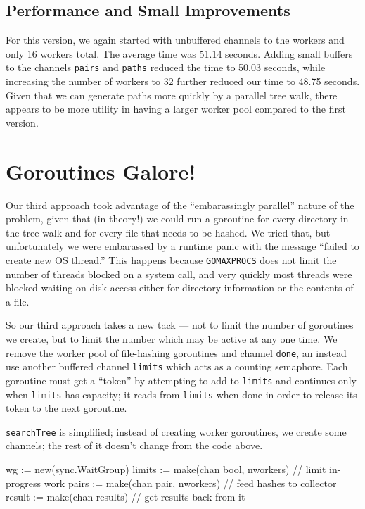 \documentclass[12pt,notitlepage]{article}
\begin{document}
\subsection{Performance and Small Improvements}
For this version, we again started with unbuffered channels to the workers and
only 16 workers total. The average time was 51.14 seconds. Adding small buffers
to the channels \verb|pairs| and \verb|paths| reduced the time to 50.03 seconds,
while increasing the number of workers to 32 further reduced our time to 48.75
seconds. Given that we can generate paths more quickly by a parallel tree walk,
there appears to be more utility in having a larger worker pool compared to the
first version.

\section{Goroutines Galore!}
Our third approach took advantage of the ``embarassingly parallel'' nature of
the problem, given that (in theory!) we could run a goroutine for every directory in
the tree walk and for every file that needs to be hashed. We tried that, but
unfortunately we were embarassed by a runtime panic with the message ``failed to
create new OS thread.'' This happens because \verb|GOMAXPROCS| does not limit the
number of threads blocked on a system call, and very quickly most threads were 
blocked waiting on disk access either for directory information or the contents 
of a file.

So our third approach takes a new tack --- not to limit the number of goroutines
we create, but to limit the number which may be active at any one time. We remove
the worker pool of file-hashing goroutines and channel \verb|done|, an instead
use another buffered channel \verb|limits| which acts as a counting semaphore.
Each goroutine must get a ``token'' by attempting to add to \verb|limits| and
continues only when \verb|limits| has capacity; it reads from \verb|limits| when
done in order to release its token to the next goroutine.

\verb|searchTree| is simplified; instead of creating worker goroutines, we create
some channels; the rest of it doesn't change from the code above.

\begin{golang}
	wg := new(sync.WaitGroup)
	limits := make(chan bool, nworkers) // limit in-progress work
	pairs := make(chan pair, nworkers)  // feed hashes to collector
	result := make(chan results)        // get results back from it
\end{golang}
\end{document}
